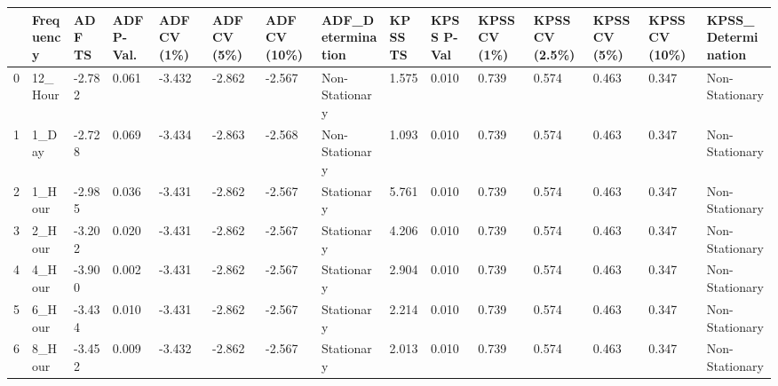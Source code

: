 \begin{tabular}{lllllllllllllll}
\toprule
 & Frequency & ADF TS & ADF P-Val. & ADF CV (1\%) & ADF CV (5\%) & ADF CV (10\%) & ADF_Determination & KPSS TS & KPSS P-Val & KPSS CV (1\%) & KPSS CV (2.5\%) & KPSS CV (5\%) & KPSS CV (10\%) & KPSS_Determination \\
\midrule
0 & 12_Hour & -2.782 & 0.061 & -3.432 & -2.862 & -2.567 & Non-Stationary & 1.575 & 0.010 & 0.739 & 0.574 & 0.463 & 0.347 & Non-Stationary \\
1 & 1_Day & -2.728 & 0.069 & -3.434 & -2.863 & -2.568 & Non-Stationary & 1.093 & 0.010 & 0.739 & 0.574 & 0.463 & 0.347 & Non-Stationary \\
2 & 1_Hour & -2.985 & 0.036 & -3.431 & -2.862 & -2.567 & Stationary & 5.761 & 0.010 & 0.739 & 0.574 & 0.463 & 0.347 & Non-Stationary \\
3 & 2_Hour & -3.202 & 0.020 & -3.431 & -2.862 & -2.567 & Stationary & 4.206 & 0.010 & 0.739 & 0.574 & 0.463 & 0.347 & Non-Stationary \\
4 & 4_Hour & -3.900 & 0.002 & -3.431 & -2.862 & -2.567 & Stationary & 2.904 & 0.010 & 0.739 & 0.574 & 0.463 & 0.347 & Non-Stationary \\
5 & 6_Hour & -3.434 & 0.010 & -3.431 & -2.862 & -2.567 & Stationary & 2.214 & 0.010 & 0.739 & 0.574 & 0.463 & 0.347 & Non-Stationary \\
6 & 8_Hour & -3.452 & 0.009 & -3.432 & -2.862 & -2.567 & Stationary & 2.013 & 0.010 & 0.739 & 0.574 & 0.463 & 0.347 & Non-Stationary \\
\bottomrule
\end{tabular}
